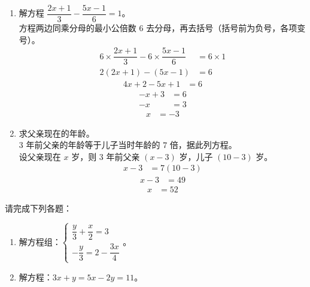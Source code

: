 \documentclass[12pt,a4paper,fontset=none]{exam-zh}
\begin{document}
\begin{solution}
    \begin{enumerate}[label=(\alph*)]
        \item 解方程 $\dfrac{2x+1}{3} - \dfrac{5x-1}{6} = 1$。 \\
        方程两边同乘分母的最小公倍数 $6$ 去分母，再去括号（括号前为负号，各项变号）。 \\
        \begin{align*}
            6\times\dfrac{2x+1}{3} - 6\times\dfrac{5x-1}{6} &= 6\times1 \\
            2(2x+1) - (5x-1) &= 6
        \end{align*}
        \begin{align*}
            4x + 2 - 5x + 1 &= 6
        \end{align*}
        \begin{align*}
            -x + 3 &= 6 \\
            -x &= 3
        \end{align*}
        \begin{align*}
            x &= -3
        \end{align*}

        \item 求父亲现在的年龄。 \\
        $3$ 年前父亲的年龄等于儿子当时年龄的 $7$ 倍，据此列方程。 \\
        设父亲现在 $x$ 岁，则 $3$ 年前父亲 $(x-3)$ 岁，儿子 $(10-3)$ 岁。 \\
        \begin{align*}
            x - 3 &= 7(10-3)
        \end{align*}
        \begin{align*}
            x - 3 &= 49
        \end{align*}
        \begin{align*}
            x &= 52
        \end{align*}
    \end{enumerate}
\end{solution}

\begin{question}[points = 10]
    请完成下列各题：

    \begin{enumerate}[label=(\alph*)]
        \item 解方程组：$\begin{cases} \dfrac{y}{3} + \dfrac{x}{2} = 3 \\[2ex] -\dfrac{y}{3}  = 2 - \dfrac{3x}{4}\end{cases}$。

        \item 解方程：$3x + y = 5x - 2y = 11$。
    \end{enumerate}
\end{question}
\end{document}
